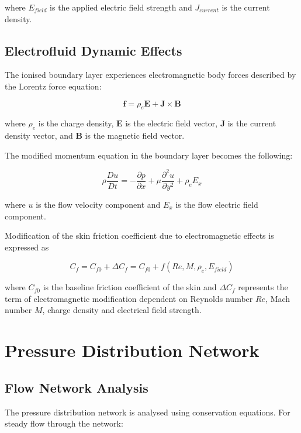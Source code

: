 \documentclass[12pt,a4paper]{article}
\begin{document}
where $E_{field}$ is the applied electric field strength and $J_{current}$ is the current density.

\subsection{Electrofluid Dynamic Effects}

The ionised boundary layer experiences electromagnetic body forces described by the Lorentz force equation:

\begin{equation}
\mathbf{f} = \rho_e \mathbf{E} + \mathbf{J} \times \mathbf{B}
\end{equation}

where $\rho_e$ is the charge density, $\mathbf{E}$ is the electric field vector, $\mathbf{J}$ is the current density vector, and $\mathbf{B}$ is the magnetic field vector.

The modified momentum equation in the boundary layer becomes the following:

\begin{equation}
\rho \frac{Du}{Dt} = -\frac{\partial p}{\partial x} + \mu \frac{\partial^2 u}{\partial y^2} + \rho_e E_x
\end{equation}

where $u$ is the flow velocity component and $E_x$ is the flow electric field component.

Modification of the skin friction coefficient due to electromagnetic effects is expressed as

\begin{equation}
C_f = C_{f0} + \Delta C_f = C_{f0} + f(Re, M, \rho_e, E_{field})
\end{equation}

where $C_{f0}$ is the baseline friction coefficient of the skin and $\Delta C_f$ represents the term of electromagnetic modification dependent on Reynolds number $Re$, Mach number $M$, charge density and electrical field strength.

\section{Pressure Distribution Network}

\subsection{Flow Network Analysis}

The pressure distribution network is analysed using conservation equations. For steady flow through the network:
\end{document}
